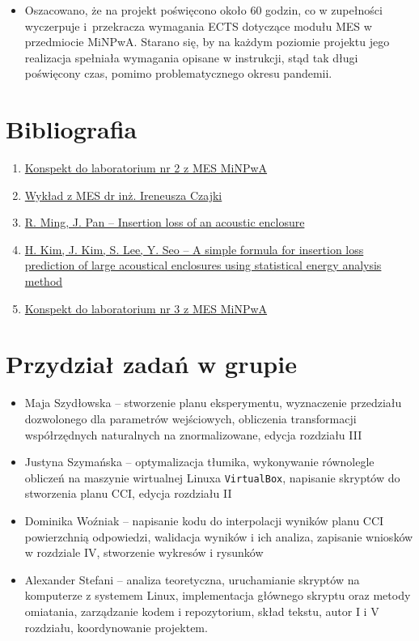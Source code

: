 \documentclass{sprawozdanie-agh}
\renewcommand{\thesection}{\Roman{section}}
\begin{document}
\begin{itemize}
    \item Oszacowano, że na projekt poświęcono około 60 godzin, co w zupełności wyczerpuje i~przekracza wymagania ECTS dotyczące modułu MES w przedmiocie MiNPwA. Starano się, by na każdym poziomie projektu jego realizacja spełniała wymagania opisane w instrukcji, stąd tak długi poświęcony czas, pomimo problematycznego okresu pandemii.
\end{itemize}
\section{Bibliografia}
\renewcommand\labelenumi{[\theenumi]}
\begin{enumerate}
    \item \href{http://home.agh.edu.pl/~iczajka/assets/pliki/MiNPwA2018_2.pdf}{\label{ref1}Konspekt do laboratorium nr 2 z MES MiNPwA}
    \item \href{http://home.agh.edu.pl/~iczajka/assets/pliki/MiNPwA_wyklad1-nup.pdf}{\label{ref2}Wykład z MES dr inż. Ireneusza Czajki}
    \item \href{https://asa.scitation.org/doi/pdf/10.1121/1.1819377}{\label{ref3}R. Ming, J. Pan -- Insertion loss of an acoustic enclosure}
    \item \href{https://www.sciencedirect.com/science/article/pii/S2092678216302618}{\label{ref4}H. Kim, J. Kim, S. Lee, Y. Seo -- A simple formula for insertion loss prediction of large acoustical enclosures using statistical energy analysis method}
    \item \href{http://home.agh.edu.pl/~iczajka/assets/pliki/MiNPwA2018_3.pdf}{\label{ref5}Konspekt do laboratorium nr 3 z MES MiNPwA}
\end{enumerate}
\renewcommand\thesection{\fnsymbol{section}}
\section{Przydział zadań w grupie}
\begin{itemize}
    \item Maja Szydłowska -- stworzenie planu eksperymentu, wyznaczenie przedziału dozwolonego dla parametrów wejściowych, obliczenia transformacji współrzędnych naturalnych na znormalizowane, edycja rozdziału III
    \item Justyna Szymańska -- optymalizacja tłumika, wykonywanie równolegle obliczeń na maszynie wirtualnej Linuxa \texttt{VirtualBox}, napisanie skryptów do stworzenia planu CCI, edycja rozdziału II
    \item Dominika Woźniak -- napisanie kodu do interpolacji wyników planu CCI powierzchnią odpowiedzi, walidacja wyników i ich analiza, zapisanie wniosków w rozdziale IV, stworzenie wykresów i rysunków
    \item Alexander Stefani -- analiza teoretyczna, uruchamianie skryptów na komputerze z systemem Linux, implementacja głównego skryptu oraz metody omiatania, zarządzanie kodem i repozytorium, skład tekstu, autor I i V rozdziału, koordynowanie projektem.
\end{itemize}
\end{document}
